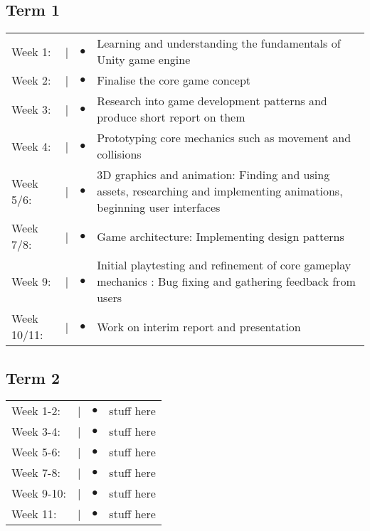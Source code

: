 \documentclass[12pt]{article}
\begin{document}
\subsection{Term 1}
\begin{tabular}{@{}p{2cm}@{}>{\raggedright\arraybackslash}p{0.5cm}@{}>{\raggedright\arraybackslash}p{0.5cm}@{}p{12cm}}
Week 1: & \textcolor{black}{|} & $\bullet$ & Learning and understanding the fundamentals of Unity game engine \\
Week 2: & \textcolor{black}{|} & $\bullet$ & Finalise the core game concept \\
Week 3: & \textcolor{black}{|} & $\bullet$ & Research into game development patterns and produce short report on them \\
Week 4: & \textcolor{black}{|} & $\bullet$ & Prototyping core mechanics such as movement and collisions \\
Week 5/6: & \textcolor{black}{|} & $\bullet$ & 3D graphics and animation: Finding and using assets, researching and implementing animations, beginning user interfaces\\
Week 7/8: & \textcolor{black}{|} & $\bullet$ & Game architecture: Implementing design patterns \\
Week 9: & \textcolor{black}{|} & $\bullet$ & Initial playtesting and refinement of core gameplay mechanics : Bug fixing and gathering feedback from users\\
Week 10/11: & \textcolor{black}{|} & $\bullet$ & Work on interim report and presentation \\
\end{tabular}

\subsection{Term 2}
\begin{tabular}{@{}p{2cm}@{}>{\raggedright\arraybackslash}p{0.5cm}@{}>{\raggedright\arraybackslash}p{0.5cm}@{}p{12cm}}
Week 1-2: & \textcolor{black}{|} & $\bullet$ & stuff here \\
Week 3-4: & \textcolor{black}{|} & $\bullet$ & stuff here \\
Week 5-6: & \textcolor{black}{|} & $\bullet$ & stuff here \\
Week 7-8: & \textcolor{black}{|} & $\bullet$ & stuff here \\
Week 9-10: & \textcolor{black}{|} & $\bullet$ & stuff here \\
Week 11: & \textcolor{black}{|} & $\bullet$ & stuff here \\
\end{tabular}
\end{document}
